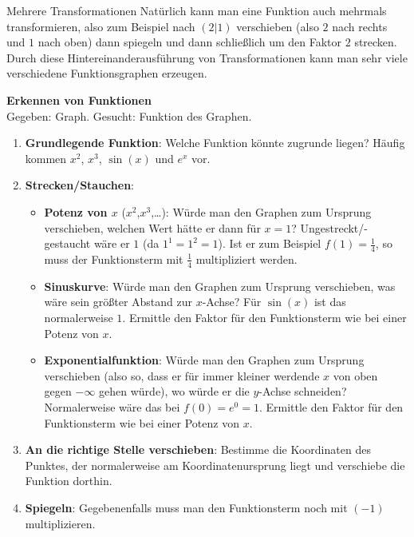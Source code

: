 \begin{bla}{Mehrere Transformationen}
  Natürlich kann man eine Funktion auch mehrmals transformieren, also zum Beispiel nach $(2|1)$ verschieben (also $2$ nach rechts und $1$ nach oben) dann spiegeln und dann schließlich um den Faktor $2$ strecken. Durch diese Hintereinanderausführung von Transformationen kann man sehr viele verschiedene Funktionsgraphen erzeugen.
\end{bla}

\begin{koch}
  \textbf{Erkennen von Funktionen} \\
  Gegeben: Graph. Gesucht: Funktion des Graphen.
  \begin{enumerate}
    \item \textbf{Grundlegende Funktion}: Welche Funktion könnte zugrunde liegen? Häufig kommen $x^2$, $x^3$, $\sin(x)$ und $e^x$ vor.
    \item \textbf{Strecken/Stauchen}:
      \begin{itemize}
        \item \textbf{Potenz von $x$} ($x^2$,$x^3$,\dots): Würde man den Graphen zum Ursprung verschieben, welchen Wert hätte er dann für $x=1$? Ungestreckt/-gestaucht wäre er $1$ (da $1^1=1^2=1$). Ist er zum Beispiel $f(1)=\frac{1}{4}$, so muss der Funktionsterm mit $\frac{1}{4}$ multipliziert werden.
        \item \textbf{Sinuskurve}: Würde man den Graphen zum Ursprung verschieben, was wäre sein größter Abstand zur $x$-Achse? Für $\sin(x)$ ist das normalerweise $1$. Ermittle den Faktor für den Funktionsterm wie bei einer Potenz von $x$.
        \item \textbf{Exponentialfunktion}: Würde man den Graphen zum Ursprung verschieben (also so, dass er für immer kleiner werdende $x$ von oben gegen $-\infty$ gehen würde), wo würde er die $y$-Achse schneiden? Normalerweise wäre das bei $f(0)=e^0=1$. Ermittle den Faktor für den Funktionsterm wie bei einer Potenz von $x$.
      \end{itemize}
    \item \textbf{An die richtige Stelle verschieben}: Bestimme die Koordinaten des Punktes, der normalerweise am Koordinatenursprung liegt und verschiebe die Funktion dorthin.
    \item \textbf{Spiegeln}: Gegebenenfalls muss man den Funktionsterm noch mit $(-1)$ multiplizieren.
  \end{enumerate}
\end{koch}

